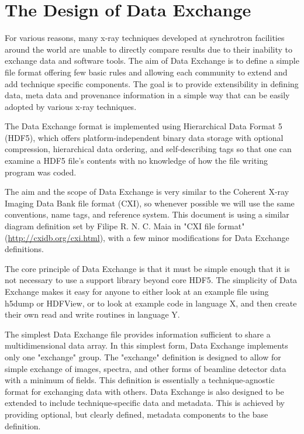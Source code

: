 
\section{The Design of Data Exchange} 

For various reasons, many x-ray techniques developed at synchrotron facilities
around the world are unable to directly compare results due to their 
inability to exchange data and software tools. The aim of Data Exchange is to
define a simple file format offering few basic rules and allowing each
community to extend and add technique specific components. The goal is to
provide extensibility in defining data, meta data and
provenance information in a simple way that can be easily adopted by various
x-ray techniques.

The Data Exchange format is implemented using Hierarchical Data Format 5
(HDF5), which offers platform-independent binary data storage with optional
compression, hierarchical data ordering, and self-describing tags so that one
can examine a HDF5 file's contents with no knowledge of how the file writing
program was coded.

The aim and the scope of Data Exchange is very similar to the Coherent X-ray
Imaging  Data Bank file format (CXI), so whenever possible we will use the
same conventions, name tags, and reference system. This document is using a
similar diagram definition set by Filipe R. N. C. Maia in "CXI file format"
(\url{http://cxidb.org/cxi.html}), with a few minor modifications for Data
Exchange definitions.

The core principle of Data Exchange is that it must be simple enough that it
is not necessary to use a support library beyond core HDF5. The simplicity of
Data Exchange makes it easy for anyone to either look at an example file 
using h5dump or HDFView, or to look at example code in language X, and 
then create their own read and write routines in language Y.

The simplest Data Exchange file provides information
sufficient to share a multidimensional data array. In
this simplest form, Data Exchange implements only one "exchange"
group. The "exchange" definition is designed to allow for simple exchange of
images, spectra, and other forms of beamline detector data with a minimum of
fields. This definition is essentially a technique-agnostic format for
exchanging data with others. Data Exchange is also designed to be extended
to include technique-specific data and metadata.  This is
achieved by providing optional, but clearly defined, metadata components to
the base definition.

